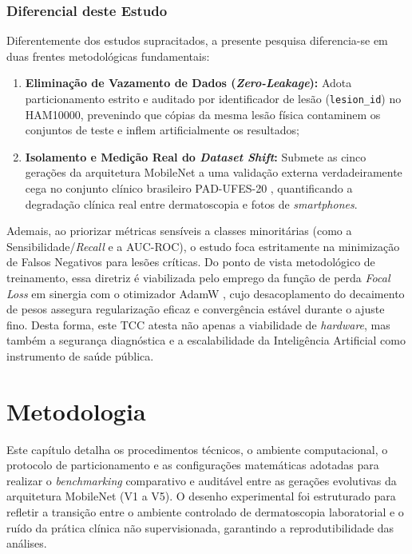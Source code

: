 \documentclass[oneside,english,brazilian]{UNISINOSmonografia}
\begin{document}
\subsection{Diferencial deste Estudo}
Diferentemente dos estudos supracitados, a presente pesquisa diferencia-se em duas frentes metodológicas fundamentais:
\begin{enumerate}
    \item \textbf{Eliminação de Vazamento de Dados (\textit{Zero-Leakage}):} Adota particionamento estrito e auditado por identificador de lesão (\texttt{lesion\_id}) no HAM10000, prevenindo que cópias da mesma lesão física contaminem os conjuntos de teste e inflem artificialmente os resultados;
    \item \textbf{Isolamento e Medição Real do \textit{Dataset Shift}:} Submete as cinco gerações da arquitetura MobileNet a uma validação externa verdadeiramente cega no conjunto clínico brasileiro PAD-UFES-20 \cite{pacheco2020pad}, quantificando a degradação clínica real entre dermatoscopia e fotos de \textit{smartphones}.
\end{enumerate}

Ademais, ao priorizar métricas sensíveis a classes minoritárias (como a Sensibilidade/\textit{Recall} e a AUC-ROC), o estudo foca estritamente na minimização de Falsos Negativos para lesões críticas. Do ponto de vista metodológico de treinamento, essa diretriz é viabilizada pelo emprego da função de perda \textit{Focal Loss} \cite{lin2017focal} em sinergia com o otimizador AdamW \cite{loshchilov2017decoupled}, cujo desacoplamento do decaimento de pesos assegura regularização eficaz e convergência estável durante o ajuste fino. Desta forma, este TCC atesta não apenas a viabilidade de \textit{hardware}, mas também a segurança diagnóstica e a escalabilidade da Inteligência Artificial como instrumento de saúde pública.



\chapter{Metodologia}
Este capítulo detalha os procedimentos técnicos, o ambiente computacional, o protocolo de particionamento e as configurações matemáticas adotadas para realizar o \textit{benchmarking} comparativo e auditável entre as gerações evolutivas da arquitetura MobileNet (V1 a V5). O desenho experimental foi estruturado para refletir a transição entre o ambiente controlado de dermatoscopia laboratorial e o ruído da prática clínica não supervisionada, garantindo a reprodutibilidade das análises.
\end{document}
